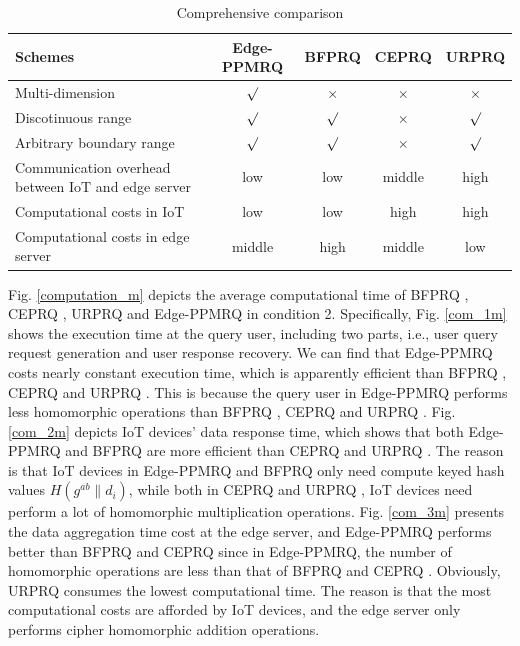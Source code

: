 \documentclass[IEEE JOURNAL OF BIOMEDICAL AND HEALTH INFORMATICS]{IEEEtran}
\begin{document}
\begin{table}\centering
	
	\caption{Comprehensive comparison}
	
	\begin{tabular*}{14.7cm}{p{6.5cm}cccc}
		
		\hline
		Schemes & Edge-PPMRQ & BFPRQ \cite{mahdikhani2020IoT} & CEPRQ \cite{hasan2020IoT} & URPRQ \cite{mahdikhani2020using} \\
		\hline
		Multi-dimension             & $\surd$     & $\times$    & $\times$    & $\times$ \\
		Discotinuous range         & $\surd$     & $\surd$  & $\times$  & $\surd$ \\
		Arbitrary boundary range            & $\surd$     & $\surd$  & $\times$  & $\surd$ \\
		Communication overhead between IoT and edge server & low       & low         & middle      & high\\	
		Computational costs in IoT & low        & low         & high	      & high \\
		Computational costs in edge server & middle & high      & middle      & low \\
		\hline
	\end{tabular*}
	\label{comprehensive comparison}
	
\end{table} 



Fig. \ref{computation_m} depicts the average computational time of BFPRQ \cite{mahdikhani2020IoT}, CEPRQ \cite{hasan2020IoT}, URPRQ \cite{mahdikhani2020using} and Edge-PPMRQ in condition 2. Specifically, Fig. \ref{com_1m} shows the execution time at the query user, including two parts, i.e., user query request generation and user response recovery. We can find that Edge-PPMRQ costs nearly constant execution time, which is apparently efficient than BFPRQ \cite{mahdikhani2020IoT}, CEPRQ \cite{hasan2020IoT} and URPRQ \cite{mahdikhani2020using}. This is because the query user in Edge-PPMRQ performs less homomorphic operations than BFPRQ \cite{mahdikhani2020IoT}, CEPRQ \cite{hasan2020IoT} and URPRQ \cite{mahdikhani2020using}. Fig. \ref{com_2m} depicts IoT devices' data response time, which shows that both Edge-PPMRQ and BFPRQ \cite{mahdikhani2020IoT} are more efficient than CEPRQ \cite{hasan2020IoT} and URPRQ \cite{mahdikhani2020using}. The reason is that IoT devices in Edge-PPMRQ and BFPRQ \cite{mahdikhani2020IoT} only need compute keyed hash values $H( g^{ab} \| d_i)$, while both in CEPRQ \cite{hasan2020IoT} and URPRQ \cite{mahdikhani2020using}, IoT devices need perform a lot of homomorphic multiplication operations. Fig. \ref{com_3m} presents the data aggregation time cost at the edge server, and  Edge-PPMRQ performs better than BFPRQ \cite{mahdikhani2020IoT} and CEPRQ \cite{hasan2020IoT} since in Edge-PPMRQ, the number of homomorphic operations are less than that of BFPRQ \cite{mahdikhani2020IoT} and CEPRQ \cite{hasan2020IoT}. Obviously, URPRQ \cite{mahdikhani2020using} consumes the lowest computational time. The reason is that the most computational costs are afforded by IoT devices, and the edge server only performs cipher homomorphic addition operations.
\end{document}

